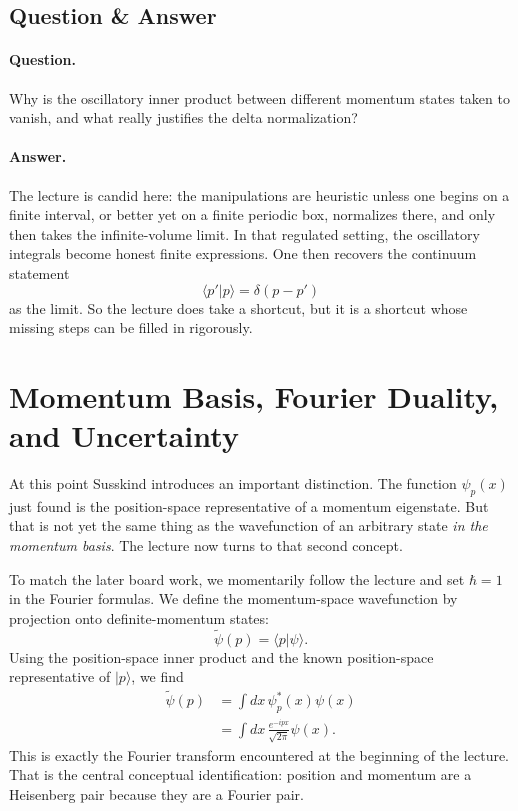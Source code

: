 \subsection{Question \& Answer}

\paragraph{Question.} Why is the oscillatory inner product between different momentum states taken to vanish, and what really justifies the delta normalization?

\paragraph{Answer.} The lecture is candid here: the manipulations are heuristic unless one begins on a finite interval, or better yet on a finite periodic box, normalizes there, and only then takes the infinite-volume limit. In that regulated setting, the oscillatory integrals become honest finite expressions. One then recovers the continuum statement
\begin{equation}
\langle p'|p\rangle=\delta(p-p')
\end{equation}
as the limit. So the lecture does take a shortcut, but it is a shortcut whose missing steps can be filled in rigorously.

\section{Momentum Basis, Fourier Duality, and Uncertainty}

At this point Susskind introduces an important distinction. The function $\psi_p(x)$ just found is the position-space representative of a momentum eigenstate. But that is not yet the same thing as the wavefunction of an arbitrary state \emph{in the momentum basis}. The lecture now turns to that second concept.

To match the later board work, we momentarily follow the lecture and set $\hbar=1$ in the Fourier formulas. We define the momentum-space wavefunction by projection onto definite-momentum states:
\begin{equation}
\widetilde{\psi}(p)=\langle p|\psi\rangle.
\end{equation}
Using the position-space inner product and the known position-space representative of $|p\rangle$, we find
\begin{align}
\widetilde{\psi}(p)
&=\int dx\,\psi_p^*(x)\psi(x) \\
&=\int dx\,\frac{e^{-ipx}}{\sqrt{2\pi}}\psi(x).
\end{align}
This is exactly the Fourier transform encountered at the beginning of the lecture. That is the central conceptual identification: position and momentum are a Heisenberg pair because they are a Fourier pair.

